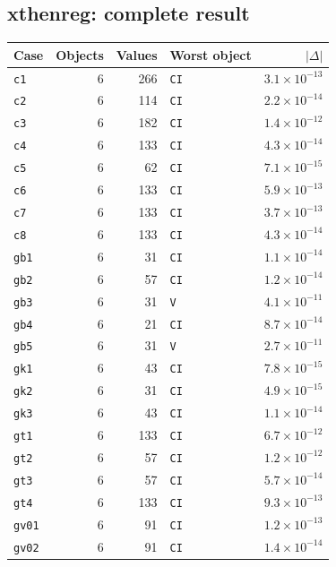 \documentclass[10.5pt,a4paper]{article}
\begin{document}
\subsection*{xthenreg: complete result}

\begin{longtable}{@{}p{3.6cm}rrp{4.9cm}r@{}}
\toprule
Case & Objects & Values & Worst object & $|\Delta|$ \\
\midrule
\endhead
\texttt{c1} & 6 & 266 & \texttt{CI} & $3.1\times10^{-13}$ \\
\texttt{c2} & 6 & 114 & \texttt{CI} & $2.2\times10^{-14}$ \\
\texttt{c3} & 6 & 182 & \texttt{CI} & $1.4\times10^{-12}$ \\
\texttt{c4} & 6 & 133 & \texttt{CI} & $4.3\times10^{-14}$ \\
\texttt{c5} & 6 & 62 & \texttt{CI} & $7.1\times10^{-15}$ \\
\texttt{c6} & 6 & 133 & \texttt{CI} & $5.9\times10^{-13}$ \\
\texttt{c7} & 6 & 133 & \texttt{CI} & $3.7\times10^{-13}$ \\
\texttt{c8} & 6 & 133 & \texttt{CI} & $4.3\times10^{-14}$ \\
\texttt{gb1} & 6 & 31 & \texttt{CI} & $1.1\times10^{-14}$ \\
\texttt{gb2} & 6 & 57 & \texttt{CI} & $1.2\times10^{-14}$ \\
\texttt{gb3} & 6 & 31 & \texttt{V} & $4.1\times10^{-11}$ \\
\texttt{gb4} & 6 & 21 & \texttt{CI} & $8.7\times10^{-14}$ \\
\texttt{gb5} & 6 & 31 & \texttt{V} & $2.7\times10^{-11}$ \\
\texttt{gk1} & 6 & 43 & \texttt{CI} & $7.8\times10^{-15}$ \\
\texttt{gk2} & 6 & 31 & \texttt{CI} & $4.9\times10^{-15}$ \\
\texttt{gk3} & 6 & 43 & \texttt{CI} & $1.1\times10^{-14}$ \\
\texttt{gt1} & 6 & 133 & \texttt{CI} & $6.7\times10^{-12}$ \\
\texttt{gt2} & 6 & 57 & \texttt{CI} & $1.2\times10^{-12}$ \\
\texttt{gt3} & 6 & 57 & \texttt{CI} & $5.7\times10^{-14}$ \\
\texttt{gt4} & 6 & 133 & \texttt{CI} & $9.3\times10^{-13}$ \\
\texttt{gv01} & 6 & 91 & \texttt{CI} & $1.2\times10^{-13}$ \\
\texttt{gv02} & 6 & 91 & \texttt{CI} & $1.4\times10^{-14}$ \\

\end{longtable}
\end{document}
